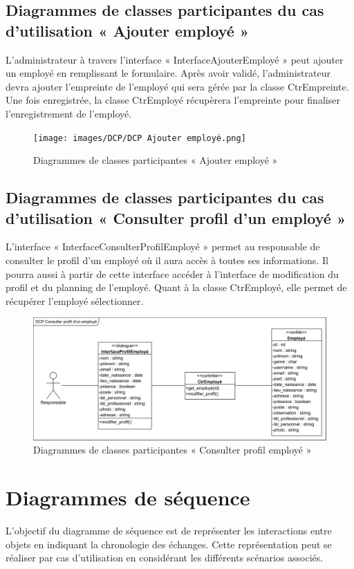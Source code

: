 \subsection*{Diagrammes de classes participantes du cas d'utilisation « Ajouter employé »}
L’administrateur à travers l’interface « InterfaceAjouterEmployé » peut ajouter
un employé en remplissant le formulaire. Après avoir validé, l’administrateur
devra ajouter l’empreinte de l’employé qui sera gérée par la classe
CtrEmpreinte.  Une fois enregistrée, la classe CtrEmployé récupèrera l’empreinte
pour finaliser l’enregistrement de l’employé. 

\clearpage

\begin{figure}[h!]
    \centering
    \texttt{[image: images/DCP/DCP Ajouter employé.png]}
    \caption{Diagrammes de classes participantes « Ajouter employé »}
    \label{fig31}
\end{figure}
        
\subsection*{Diagrammes de classes participantes du cas d'utilisation « Consulter profil d'un employé »}
L’interface « InterfaceConsulterProfilEmployé » permet au responsable de 
consulter le profil d’un employé où il aura accès à toutes ses informations. Il 
pourra aussi à partir de cette interface accéder à l’interface de modification
du profil et du planning de l’employé. Quant à la classe CtrEmployé, elle permet 
de récupérer l’employé sélectionner. 

\begin{figure}[h!]
    \centering
    \includegraphics[scale=0.72]{images/DCP/DCP_consulter_profil_d'un_employe.png}
    \caption{Diagrammes de classes participantes « Consulter profil employé »}
    \label{fig32}
\end{figure}
             
\section{Diagrammes de séquence}
L’objectif du diagramme de séquence est de représenter les interactions entre 
objets en indiquant la chronologie des échanges. Cette représentation peut se 
réaliser par cas d’utilisation en considérant les différents scénarios 
associés.\cite{9} 
    
